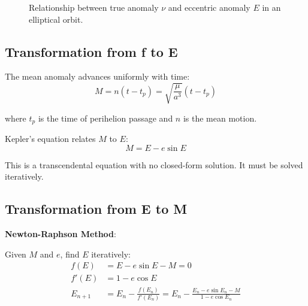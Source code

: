 \begin{figure}[htbp]
\caption{Relationship between true anomaly $\nu$ and eccentric anomaly $E$ in an elliptical orbit.}
\label{fig:anomalies}
\end{figure}

\subsection{Transformation from f to E}

The mean anomaly advances uniformly with time:
\begin{equation}
    M = n(t - t_p) = \sqrt{\frac{\mu}{a^3}}(t - t_p)
\end{equation}

where $t_p$ is the time of perihelion passage and $n$ is the mean motion.

Kepler's equation relates $M$ to $E$:
\begin{equation}
    M = E - e\sin E
\end{equation}

This is a transcendental equation with no closed-form solution. It must be solved iteratively.

\subsection{Transformation from E to M}

\textbf{Newton-Raphson Method}:

Given $M$ and $e$, find $E$ iteratively:
\begin{align}
    f(E) &= E - e\sin E - M = 0 \\
    f'(E) &= 1 - e\cos E \\
    E_{n+1} &= E_n - \frac{f(E_n)}{f'(E_n)} = E_n - \frac{E_n - e\sin E_n - M}{1 - e\cos E_n}
\end{align}

